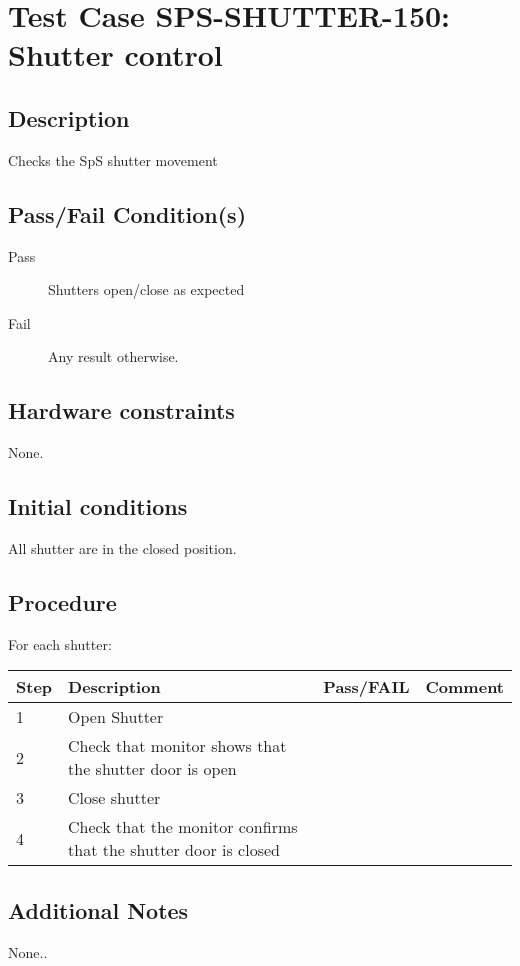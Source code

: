 \section{Test Case SPS-SHUTTER-150: Shutter control}

\subsection{Description}

Checks the SpS shutter movement

\subsection{Pass/Fail Condition(s)}

\begin{description}
\item [Pass] Shutters open/close as expected
\item [Fail] Any result otherwise. 
\end{description}

\subsection{Hardware constraints}

None.

\subsection{Initial conditions}

All shutter are in the closed position.

\subsection{Procedure}

For each shutter:

\begin{table}[H]
    \begin{tabular}{|l| p{5cm} |l| p{5cm} |}
    \hline
    {\bf Step} & {\bf Description} & {\bf Pass/FAIL} & {\bf Comment}  \\ \hline
    1 & Open Shutter &  &  \\ \hline
    2 & Check that monitor shows that the shutter door is open &  &  \\ \hline
    3 & Close shutter &  &  \\ \hline
    4 & Check that the monitor confirms that the shutter door is closed &  &  \\ \hline
    \end{tabular}
\end{table}


\subsection{Additional Notes}

None..
